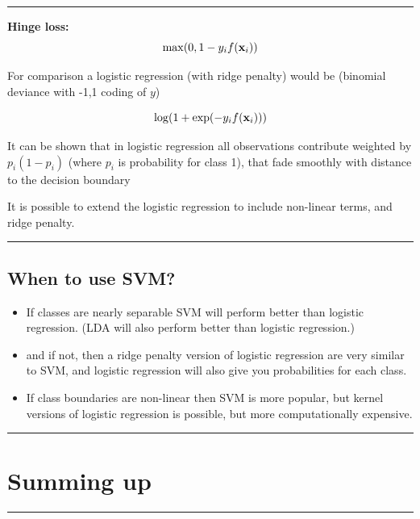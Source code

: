 \documentclass[]{article}
\providecommand{\tightlist}{%
  \setlength{\itemsep}{0pt}\setlength{\parskip}{0pt}}
\begin{document}
\begin{center}\rule{0.5\linewidth}{\linethickness}\end{center}

\textbf{Hinge loss:} \[\max(0,1-y_if({\bf x}_i))\]

For comparison a logistic regression (with ridge penalty) would be
(binomial deviance with -1,1 coding of \(y\))

\[ \log(1+\exp(-y_i f({\bf x}_i)))\]

It can be shown that in logistic regression all observations contribute
weighted by \(p_i(1-p_i)\) (where \(p_i\) is probability for class 1),
that fade smoothly with distance to the decision boundary

It is possible to extend the logistic regression to include non-linear
terms, and ridge penalty.

\begin{center}\rule{0.5\linewidth}{\linethickness}\end{center}

\hypertarget{when-to-use-svm}{%
\subsection{When to use SVM?}\label{when-to-use-svm}}

\begin{itemize}
\tightlist
\item
  If classes are nearly separable SVM will perform better than logistic
  regression. (LDA will also perform better than logistic regression.)
\item
  and if not, then a ridge penalty version of logistic regression are
  very similar to SVM, and logistic regression will also give you
  probabilities for each class.
\item
  If class boundaries are non-linear then SVM is more popular, but
  kernel versions of logistic regression is possible, but more
  computationally expensive.
\end{itemize}

\begin{center}\rule{0.5\linewidth}{\linethickness}\end{center}

\hypertarget{summing-up}{%
\section{ Summing up }\label{summing-up}}

\begin{center}\rule{0.5\linewidth}{\linethickness}\end{center}
\end{document}
